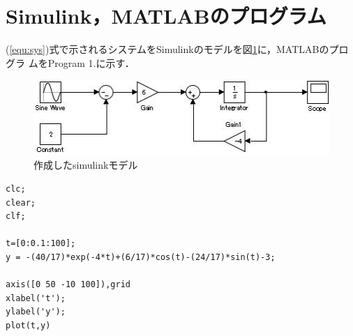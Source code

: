 \documentclass[a4paper,12pt]{jarticle}
\begin{document}
\section{Simulink，MATLABのプログラム}
(\ref{equ:sys})式で示されるシステムをSimulinkのモデルを図\ref{fig:model}に，MATLABのプログラ
ムをProgram 1.に示す．
%
\begin{figure}[hbp]
 \begin{center}
  \includegraphics[scale=.7,bb = 0 0 426 109]{fig/model.jpg}
 \end{center}
 \caption{作成したsimulinkモデル}
 \label{fig:model}
\end{figure}
%
\begin{lstlisting}[basicstyle=\ttfamily\footnotesize,frame=single,caption=作成したMATLABのプログラム]
clc;
clear; 
clf; 

t=[0:0.1:100];
y = -(40/17)*exp(-4*t)+(6/17)*cos(t)-(24/17)*sin(t)-3;

axis([0 50 -10 100]),grid 
xlabel('t');  
ylabel('y');
plot(t,y)   
\end{lstlisting}

\newpage

\end{document}
